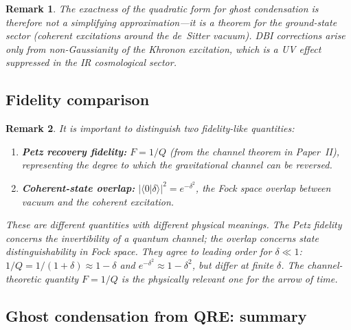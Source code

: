 \documentclass[letterpaper,twocolumn,superscriptaddress,longbibliography]{revtex4-2}
\newtheorem*{remark}{Remark}
\newcommand{\braket}[2]{\langle#1|#2\rangle}
\begin{document}
\begin{remark}
The exactness of the quadratic form for ghost condensation
is therefore not a simplifying approximation---it is a
\emph{theorem} for the ground-state sector (coherent
excitations around the de~Sitter vacuum).
DBI corrections arise only from non-Gaussianity of the
Khronon excitation, which is a UV effect suppressed in the
IR cosmological sector.
\end{remark}

\subsection{Fidelity comparison}

\begin{remark}
It is important to distinguish two fidelity-like quantities:
\begin{enumerate}
  \item \textbf{Petz recovery fidelity:}
        $F = 1/Q$ (from the channel theorem in Paper~II),
        representing the degree to which the gravitational
        channel can be reversed.
  \item \textbf{Coherent-state overlap:}
        $|\braket{0}{\delta}|^2 = e^{-\delta^2}$, the Fock
        space overlap between vacuum and the coherent excitation.
\end{enumerate}
These are \emph{different} quantities with different physical
meanings.
The Petz fidelity concerns the invertibility of a quantum channel;
the overlap concerns state distinguishability in Fock space.
They agree to leading order for $\delta \ll 1$:
$1/Q = 1/(1+\delta) \approx 1-\delta$ and
$e^{-\delta^2} \approx 1-\delta^2$, but differ at finite $\delta$.
The channel-theoretic quantity $F = 1/Q$ is the physically
relevant one for the arrow of time.
\end{remark}

\subsection{Ghost condensation from QRE: summary}
\end{document}
